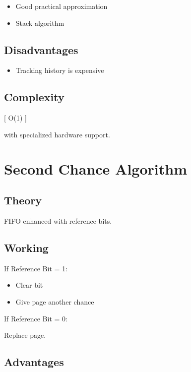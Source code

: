 \begin{itemize}
\item Good practical approximation
\item Stack algorithm
\end{itemize}

\subsection{Disadvantages}

\begin{itemize}
\item Tracking history is expensive
\end{itemize}

\subsection{Complexity}

[
O(1)
]

with specialized hardware support.

\section{Second Chance Algorithm}

\subsection{Theory}

FIFO enhanced with reference bits.

\subsection{Working}

If Reference Bit = 1:

\begin{itemize}
\item Clear bit
\item Give page another chance
\end{itemize}

If Reference Bit = 0:

Replace page.

\subsection{Advantages}


